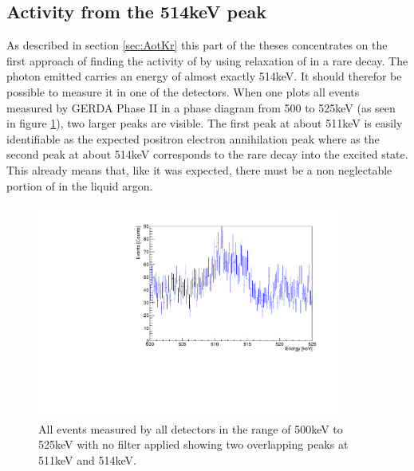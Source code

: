  
\subsection{Activity from the 514keV peak}
\label{sec:SAfrom514}

As described in section \ref{sec:AotKr} this part of the theses concentrates on the first approach of finding the activity of  by using relaxation of  in a rare decay. 
The photon emitted carries an energy of almost exactly 514keV. 
It should therefor be possible to measure it in one of the detectors. 
When one plots all events measured by GERDA Phase II in a phase diagram from 500 to 525keV (as seen in figure \ref{fig:ungefiltertes500525}), two larger peaks are visible. 
The first peak at about 511keV is easily identifiable as the expected positron electron annihilation peak where as the second peak at about 514keV corresponds to the rare  decay into the excited  state. 
This already means that, like it was expected, there must be a non neglectable portion of  in the liquid argon.
\\

\begin{figure}[t!]
	\centering
	\ifmakefigures%
	\includegraphics[width=100mm]{./Bilder/GraphNoFiltersAtAllAll.pdf}
	\fi%
	\caption{\label{fig:ungefiltertes500525}
		All events measured by all detectors in the range of 500keV to 525keV with no filter applied showing two overlapping peaks at 511keV and 514keV.
	}
\end{figure}



